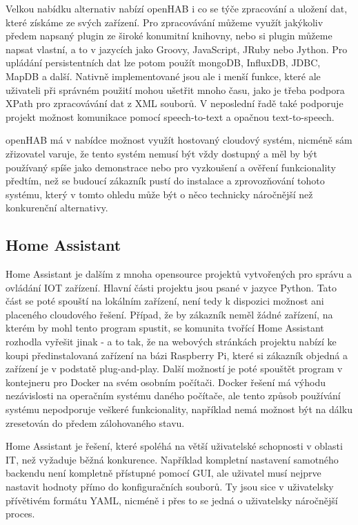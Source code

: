Velkou nabídku alternativ nabízí openHAB i co se týče zpracování a uložení dat, které získáme ze svých zařízení. Pro zpracovávání můžeme využít jakýkoliv předem napsaný plugin ze široké konumitní knihovny, nebo si plugin můžeme napsat vlastní, a to v jazycích jako Groovy, JavaScript, JRuby nebo Jython. Pro upládání persistentních dat lze potom použít mongoDB, InfluxDB, JDBC, MapDB a další. Nativně implementované jsou ale i menší funkce, které ale uživateli při správném použití mohou ušetřit mnoho času, jako je třeba podpora XPath pro zpracovávání dat z XML souborů. V neposlední řadě také podporuje projekt možnost komunikace pomocí speech-to-text a opačnou text-to-speech.

openHAB má v nabídce možnost využít hostovaný cloudový systém, nicméně sám zřizovatel varuje, že tento systém nemusí být vždy dostupný a měl by být používaný spíše jako demonstrace nebo pro vyzkoušení a ověření funkcionality předtím, než se budoucí zákazník pustí do instalace a zprovozňování tohoto systému, který v tomto ohledu může být o něco technicky náročnější než konkurenční alternativy.

\subsection{Home Assistant}

Home Assistant je dalším z mnoha opensource projektů vytvořených pro správu a ovládání IOT zařízení. Hlavní části projektu jsou psané v jazyce Python. Tato část se poté spouští na lokálním zařízení, není tedy k dispozici možnost ani placeného cloudového řešení. Případ, že by zákazník neměl žádné zařízení, na kterém by mohl tento program spustit, se komunita tvořící Home Assistant rozhodla vyřešit jinak - a to tak, že na webových stránkách projektu nabízí ke koupi předinstalovaná zařízení na bázi Raspberry Pi, které si zákazník objedná a zařízení je v podstatě plug-and-play. Další možností je poté spouštět program v kontejneru pro Docker na svém osobním počítači. Docker řešení má výhodu nezávislosti na operačním systému daného počítače, ale tento způsob používání systému nepodporuje veškeré funkcionality, například nemá možnost být na dálku zresetován do předem zálohovaného stavu.

Home Assistant je řešení, které spoléhá na větší uživatelské schopnosti v oblasti IT, než vyžaduje běžná konkurence. Například kompletní nastavení samotného backendu není kompletně přístupné pomocí GUI, ale uživatel musí nejprve nastavit hodnoty přímo do konfiguračních souborů. Ty jsou sice v uživatelsky přívětivém formátu YAML, nicméně i přes to se jedná o uživatelsky náročnější proces. 

